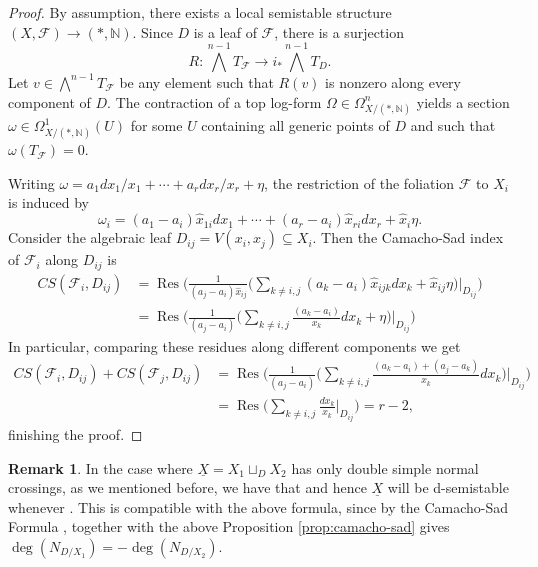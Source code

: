 \documentclass[reqno]{amsart}
\newcommand\N{\mathbb{N}}
\DeclareMathOperator{\Res}{Res}
\newcommand{\F}{\mathscr{F}}
\theoremstyle{definition}
\newtheorem{remark}[theorem]{Remark}
\theoremstyle{named}
\begin{document}
\begin{proof}
By assumption, there exists a local semistable structure $(X,\F)\to(\ast,\N)$. Since $D$ is a leaf of $\F$, there is a surjection 
$$R:\bigwedge^{n-1}T_\F\to i_*\bigwedge^{n-1}T_D.$$
Let $v\in \bigwedge^{n-1}T_\F$ be any element such that $R(v)$ is nonzero along every component of $D$. The contraction of a top log-form $\Omega\in \Omega^n_{X/(\ast,\N)}$ yields a section $\omega\in \Omega^1_{X/(\ast,\N)}(U)$ for some $U$ containing all generic points of $D$ and such that $\omega(T_\F)=0$.

Writing $\omega = a_1 dx_1/x_1 + \cdots +a_r dx_r/x_r + \eta$, the restriction of the foliation $\F$ to $X_i$ is induced by  
\[
\omega_i = (a_1-a_i) \widehat{x}_{1i}dx_1 + \cdots + (a_r-a_i) \widehat{x}_{ri}dx_r + \widehat{x}_{i}\eta.
\]
Consider the algebraic leaf $D_{ij} = V(x_i,x_j)\subseteq X_i$. Then the Camacho-Sad index of $\F_i$ along $D_{ij}$ is
\begin{align*}
CS(\F_i, D_{ij}) &= \Res\bigg(\frac{1}{(a_j-a_i)\widehat{x}_{ij}}\Big(\sum_{k\neq i, j} (a_k-a_i) \widehat{x}_{ijk}dx_k + \widehat{x}_{ij}\eta\Big)\Big\vert_{D_{ij}}\bigg)\\
& = \Res\bigg(\frac{1}{(a_j-a_i)}\Big(\sum_{k\neq i, j} \frac{(a_k-a_i)}{x_k}dx_k  + \eta\Big)\Big\vert_{D_{ij}}\bigg)
\end{align*}
In particular, comparing these residues along different components we get
\begin{align*}
    CS(\F_i,D_{ij}) + CS(\F_j,D_{ij}) & = \Res\bigg(\frac{1}{(a_j-a_i)}\Big(\sum_{k\neq i, j} \frac{(a_k-a_i) + (a_j-a_k)}{x_k}dx_k\Big)\Big\vert_{D_{ij}}\bigg)\\
     & = \Res\bigg(\sum_{k\neq i, j} \frac{dx_k}{x_k}\Big\vert_{D_{ij}}\bigg) = r-2,
\end{align*}
finishing the proof.
\end{proof}


\begin{remark}\label{double_crossings}
  In the case where $\underline{X} = X_1\sqcup_D X_2$ has only double simple normal crossings, as we mentioned before, we have that  and hence $\underline{X}$ will be d-semistable whenever . This is compatible with the above formula, since by the Camacho-Sad Formula \cite{camacho1987pontos}, together with the above Proposition \ref{prop:camacho-sad} gives $\deg (N_{D/X_1})=-\deg (N_{D/X_2})$. 
\end{remark}
\end{document}

